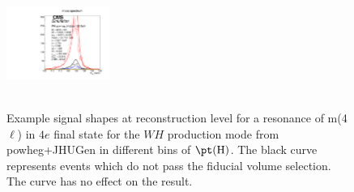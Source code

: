 \begin{figure}[htb]
\begin{center}
{      \includegraphics[width=0.3\textwidth,angle=0]{Figures/Appendix//WH_powheg_JHUgen_125_4e_pT4l_genbin4_recobin4_effs_genWeight*pileupWeight*dataMCWeight.pdf}
      \label{fig:sigfits-pT4l-WH-powheg15-JHUgen-125-maintext:e}
    }
     \\
    \\
    \caption{ Example signal shapes at reconstruction level for a resonance of m(4$\ell$) in $4e$ final state for the $WH$ production mode from {\sc powheg+JHUGen} in different bins of $\pt(\mathrm{H})$. The black curve represents events which do not pass the fiducial volume selection. The curve has no effect on the result.
    }
  \label{fig:sigfits-pT4l-WH-powheg15-JHUgen-125-maintext}
 \end{center}
\end{figure} \clearpage


